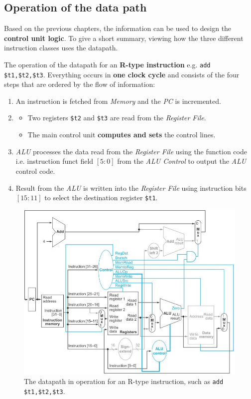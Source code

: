 \documentclass[10pt,a4paper]{article}
\begin{document}
\pagebreak

\subsection{Operation of the data path}

Based on the previous chapters, the information can be used to design the \textbf{control unit
logic}. To give a short summary, viewing how the three different instruction classes uses the datapath. 

The operation of the datapath for an \textbf{R-type instruction} e.g. \texttt{add \$t1,\$t2,\$t3}.
Everything occurs in \textbf{one clock cycle} and consists of the four steps that are ordered by the flow 
of information:
\begin{enumerate}
    \item An instruction is fetched from \textit{Memory} and the \textit{PC} is incremented.
    \item  
    \begin{itemize}
        \item Two registers \texttt{\$t2} and \texttt{\$t3} are read from the \textit{Register File}.
        \item The main control unit \textbf{computes and sets} the control lines.
    \end{itemize} 
    \item  \textit{ALU} processes the data read from the \textit{Register File} using the function 
    code i.e. instruction funct field $[5:0]$ from the \textit{ALU Control} to output the
    \textit{ALU} control code.
    \item Result from the \textit{ALU} is written into the \textit{Register File} using instruction bits $[15:11]$ to select the destination register \texttt{\$t1}.
\end{enumerate}

\begin{figure} [h!]
    \centering
    \includegraphics[scale=0.7]{Add.JPG}
    \caption{The datapath in operation for an R-type instruction, such as \texttt{add \$t1,\$t2,\$t3}.}
\end{figure}
\end{document}
